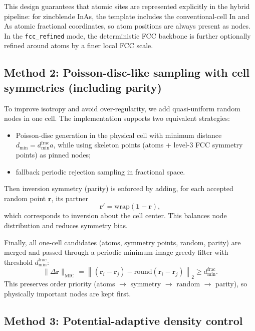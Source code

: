 This design guarantees that atomic sites are represented explicitly in the hybrid pipeline:
for zincblende InAs, the template includes the conventional-cell In and As atomic fractional coordinates,
so atom positions are always present as nodes. In the \verb|fcc_refined| mode, the deterministic FCC backbone is further
optionally refined around atoms by a finer local FCC scale.

\subsection{Method 2: Poisson-disc-like sampling with cell symmetries (including parity)}

To improve isotropy and avoid over-regularity, we add quasi-uniform random nodes in one cell.
The implementation supports two equivalent strategies:
\begin{itemize}
  \item Poisson-disc generation in the physical cell with minimum distance $d_{\min}=d_{\min}^{\mathrm{frac}}a$,
  while using skeleton points (atoms + level-3 FCC symmetry points) as pinned nodes;
  \item fallback periodic rejection sampling in fractional space.
\end{itemize}

Then inversion symmetry (parity) is enforced by adding, for each accepted random point $\mathbf{r}$,
its partner
\begin{equation}
\mathbf{r}' = \mathrm{wrap}(\mathbf{1}-\mathbf{r}),
\end{equation}
which corresponds to inversion about the cell center.
This balances node distribution and reduces symmetry bias.

Finally, all one-cell candidates (atoms, symmetry points, random, parity) are merged and passed through a periodic
minimum-image greedy filter with threshold $d_{\min}^{\mathrm{frac}}$:
\begin{equation}
\|\Delta\mathbf{r}\|_{\mathrm{MIC}} =
\left\| (\mathbf{r}_i-\mathbf{r}_j)-\mathrm{round}(\mathbf{r}_i-\mathbf{r}_j)\right\|_2
\ge d_{\min}^{\mathrm{frac}}.
\end{equation}
This preserves order priority (atoms $\rightarrow$ symmetry $\rightarrow$ random $\rightarrow$ parity),
so physically important nodes are kept first.

\subsection{Method 3: Potential-adaptive density control}

